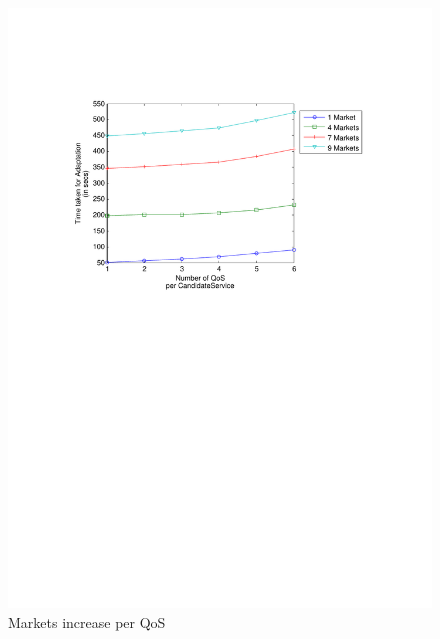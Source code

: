 \documentclass[10pt,journal,compsoc]{IEEEtran}
\begin{document}
\begin{figure}[htbp]
		\begin{minipage}{0.4\linewidth}
			\includegraphics[clip, trim=4cm 16cm 6cm 4cm, scale=0.4]{graphs/1_4_7_9_mkts_per_qos.pdf}
			\caption{Markets increase per QoS\label{fig:mkt_per_qos}}		
		\end{minipage}
		\hspace{0.9cm}
		\begin{minipage}{0.4\linewidth}

\end{minipage}
\end{figure}
\end{document}
